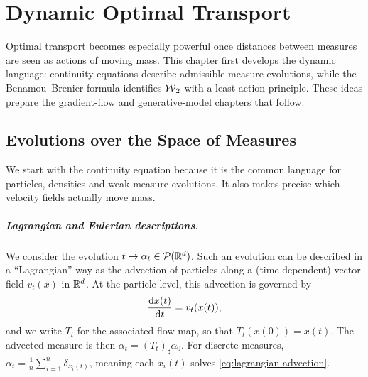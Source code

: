 
\chapter{Dynamic Optimal Transport}
\label{sec-dynamic-optimal-transport}
\label{sec-wasserstein-flows}

Optimal transport becomes especially powerful once distances between measures are seen as actions of moving mass. This chapter first develops the dynamic language: continuity equations describe admissible measure evolutions, while the Benamou--Brenier formula identifies $\operatorname{\mathcal{W}}_2$ with a least-action principle. These ideas prepare the gradient-flow and generative-model chapters that follow.

\section{Evolutions over the Space of Measures}

We start with the continuity equation because it is the common language for particles, densities and weak measure evolutions. It also makes precise which velocity fields actually move mass.

\paragraph{Lagrangian and Eulerian descriptions.}

We consider the evolution $t \mapsto \alpha_t \in \mathcal{P}(\mathbb{R}^d)$. Such an evolution can be described in a ``Lagrangian'' way as the advection of particles along a (time-dependent) vector field $v_t(x)$ in $\mathbb{R}^d$. At the particle level, this advection is governed by
\begin{equation}
    \frac{\mathrm{d} x(t)}{\mathrm{d} t} = v_t(x(t)), \label{eq:lagrangian-advection}
\end{equation}
and we write $T_t$ for the associated flow map, so that $T_t(x(0))=x(t)$. The advected measure is then $\alpha_t = (T_t)_\sharp \alpha_0$. For discrete measures, $\alpha_t = \frac{1}{n} \sum_{i=1}^n \delta_{x_i(t)}$, meaning each $x_i(t)$ solves \eqref{eq:lagrangian-advection}.

